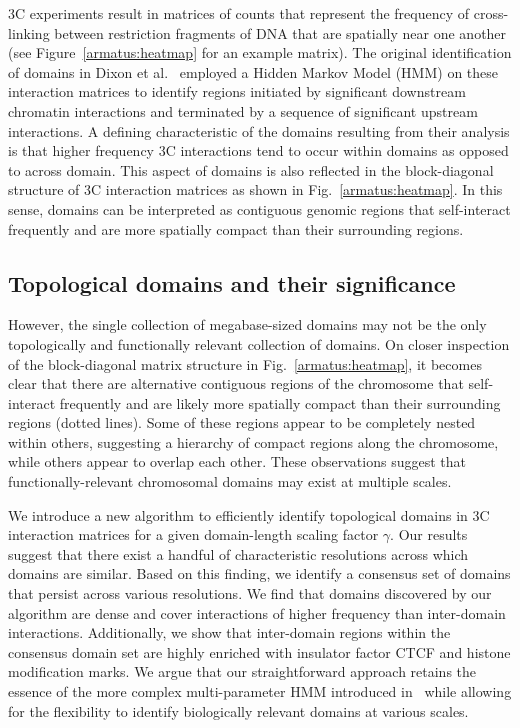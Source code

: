 \documentclass[12pt]{cmuthesis}
\begin{document}
  3C experiments result in matrices of counts that represent the frequency of cross-linking between restriction fragments of DNA that are spatially near one another (see Figure~\ref{armatus:heatmap} for an example matrix). The original identification of domains in Dixon et al.~\cite{Dixon2012} employed a Hidden Markov Model (HMM) on these interaction matrices to identify regions initiated by significant downstream chromatin interactions and terminated by a sequence of significant upstream interactions.  A defining characteristic of the domains resulting from their analysis is that higher frequency 3C interactions tend to occur within domains as opposed to across domain. This aspect of domains is also reflected in the block-diagonal structure of 3C interaction matrices as shown in Fig.~\ref{armatus:heatmap}. In this sense, domains can be interpreted as contiguous genomic regions that self-interact frequently and are more spatially compact than their surrounding regions.

  \subsection{Topological domains and their significance}

  However, the single collection of megabase-sized domains may not be the only topologically and functionally relevant collection of domains. On closer inspection of the block-diagonal matrix structure in Fig.~\ref{armatus:heatmap}, it becomes clear that there are alternative contiguous regions of the chromosome that self-interact frequently and are likely more spatially compact than their surrounding regions (dotted lines).  Some of these regions appear to be completely nested within others, suggesting a hierarchy of compact regions along the chromosome, while others appear to overlap each other. These observations suggest that functionally-relevant chromosomal domains may exist at multiple scales.

  We introduce a new algorithm to efficiently identify topological domains in 3C interaction matrices for a given domain-length scaling factor $\gamma$. Our results suggest that there exist a handful of characteristic resolutions across which domains are similar. Based on this finding, we identify a consensus set of domains that persist across various resolutions. We find that domains discovered by our algorithm are dense and cover interactions of higher frequency than inter-domain interactions. Additionally, we show that inter-domain regions within the consensus domain set are highly enriched with insulator factor CTCF and histone modification marks. We argue that our straightforward approach retains the essence of the more complex multi-parameter HMM introduced in~\cite{Dixon2012} while allowing for the flexibility to identify biologically relevant domains at various scales.
\end{document}

